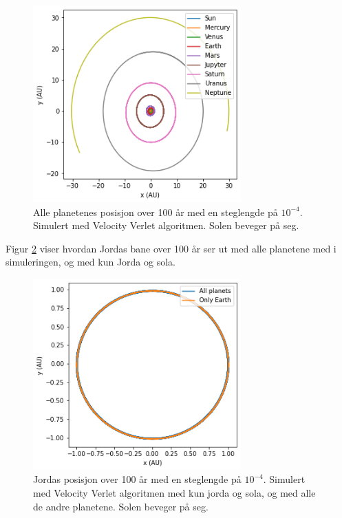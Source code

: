 \documentclass[reprint,english,notitlepage]{revtex4-1}
\begin{document}
	\begin{figure}[H]
		\includegraphics[width=80mm]{../Code/Figures/all.png}
		\caption{Alle planetenes posisjon over 100 år med en steglengde på $10^{-4}$. Simulert med Velocity Verlet algoritmen. Solen beveger på seg.}
		\label{fig:all}
	\end{figure}

	Figur \ref{fig:100years} viser hvordan Jordas bane over 100 år ser ut med alle planetene med i simuleringen, og med kun Jorda og sola.

	\begin{figure}[H]
		\includegraphics[width=80mm]{../Code/Figures/100years.png}
		\caption{Jordas posisjon over 100 år med en steglengde på $10^{-4}$. Simulert med Velocity Verlet algoritmen med kun jorda og sola, og med alle de andre planetene. Solen beveger på seg.}
		\label{fig:100years}
	\end{figure}
\end{document}
